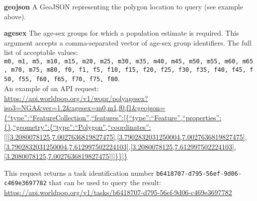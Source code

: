 \documentclass[]{article}
\begin{document}
\textbf{geojson} A GeoJSON representing the polygon location to query
(see example above).

\textbf{agesex} The age-sex groups for which a population estimate is
required. This argument accepts a comma-separated vector of age-sex
group identifiers. The full list of acceptable values:
\texttt{m0,\ m1,\ m5,\ m10,\ m15,\ m20,\ m25,\ m30,\ m35,\ m40,\ m45,\ m50,\ m55,\ m60,\ m65,\ m70,\ m75,\ m80,\ f0,\ f1,\ f5,\ f10,\ f15,\ f20,\ f25,\ f30,\ f35,\ f40,\ f45,\ f50,\ f55,\ f60,\ f65,\ f70,\ f75,\ f80}.\\

An example of an API request:\\
\href{https://api.worldpop.org/v1/wopr/polyagesex?iso3=NGA\&ver=1.2\&agesex=m0,m1,f0,f1\&geojson=\%7B\%22type\%22:\%22FeatureCollection\%22,\%22features\%22:\%5B\%7B\%22type\%22:\%22Feature\%22,\%22properties\%22:\%7B\%7D,\%22geometry\%22:\%7B\%22type\%22:\%22Polygon\%22,\%22coordinates\%22:\%5B\%5B\%5B3.2080078125,7.0027636819827475\%5D,\%5B3.7902832031250004,7.0027636819827475\%5D,\%5B3.7902832031250004,7.612997502224103\%5D,\%5B3.2080078125,7.612997502224103\%5D,\%5B3.2080078125,7.0027636819827475\%5D\%5D\%5D\%7D\%7D\%5D\%7D}{https://api.worldpop.org/v1/wopr/polyagesex?iso3=NGA\&ver=1.2\&agesex=m0,m1,f0,f1\&geojson=\{``type'':``FeatureCollection'',``features'':{[}\{``type'':``Feature'',``properties'':\{\},``geometry'':\{``type'':``Polygon'',``coordinates'':{[}{[}{[}3.2080078125,7.0027636819827475{]},{[}3.7902832031250004,7.0027636819827475{]},{[}3.7902832031250004,7.612997502224103{]},{[}3.2080078125,7.612997502224103{]},{[}3.2080078125,7.0027636819827475{]}{]}{]}\}\}{]}\}}

This request returns a task identification number
\texttt{b6418707-d795-56ef-9d06-c469e3697782} that can be used to query
the result:\\
\url{https://api.worldpop.org/v1/tasks/b6418707-d795-56ef-9d06-c469e3697782}\\
\end{document}
